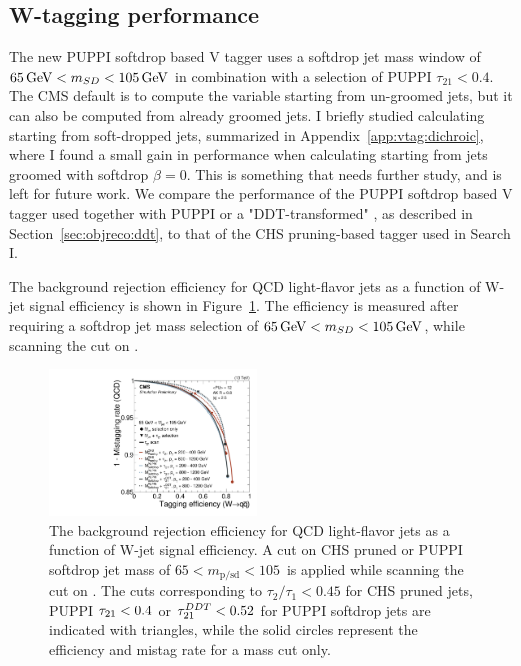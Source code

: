 \subsection{W-tagging performance}
\label{sec:searchII:vtagperf}
The new PUPPI softdrop based V tagger uses a softdrop jet mass window of $65 \,\text{Ge\hspace{-.08em}V} < m_{SD} < 105 \,\text{Ge\hspace{-.08em}V}$ in combination with a selection of PUPPI $\tau_{21}<0.4$. The CMS default is to compute the \nsubj variable starting from un-groomed jets, but it can also be computed from already groomed jets. I briefly studied calculating \nsubj starting from soft-dropped jets, summarized in Appendix~\ref{app:vtag:dichroic}, where I found a small gain in performance when calculating \nsubj starting from jets groomed with softdrop $\beta=0$. This is something that needs further study, and is left for future work. We compare the performance of the PUPPI softdrop based V tagger used together with PUPPI \nsubj or a "DDT-transformed" \nsubj, as described in Section~\ref{sec:objreco:ddt}, to that of the CHS pruning-based tagger used in Search I.\par
The background rejection efficiency for QCD light-flavor jets as a function of W-jet signal efficiency is shown in Figure~\ref{fig:searchII:roc}.
The efficiency is measured after requiring a softdrop jet mass selection of $65 \,\text{Ge\hspace{-.08em}V} < m_{SD} < 105 \,\text{Ge\hspace{-.08em}V}$, while scanning the cut on \nsubj.
\begin{figure}[h!]
\centering
\includegraphics[width=0.49\textwidth]{figures/vtagging/JME-16-003/BoostedW/roc_WqqvsQCD_2bins.pdf}
\caption{The background rejection efficiency for QCD light-flavor jets as a function of W-jet signal efficiency. A cut on CHS pruned or PUPPI softdrop jet mass of $65<m_{\mathrm{p/sd}}<105$~\GeV is applied while scanning the cut on \nsubj. The cuts corresponding to $\tau_2/\tau_1 < 0.45$ for CHS pruned jets, PUPPI $\tau_{21} < 0.4$ or $\tau_{21}^{DDT}<0.52$ for PUPPI softdrop jets are indicated with triangles, while the solid circles represent the efficiency and mistag rate for a mass cut only.}
\label{fig:searchII:roc}
\end{figure}

